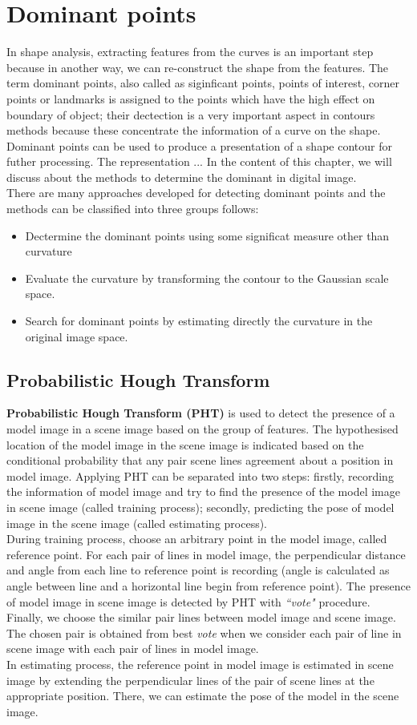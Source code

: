 \chapter{Dominant points}
In shape analysis, extracting features from the curves is an important step because in another way, we can re-construct the shape from the features. The term dominant points, also called as siginficant points, points of interest, corner points or landmarks is assigned to the points which have the high effect on boundary of object; their dectection is a very important aspect in contours methods because these concentrate the information of a curve on the shape.\\[0.2cm]
Dominant points can be used to produce a presentation of a shape contour for futher processing. The representation ...
In the content of this chapter, we will discuss about the methods to determine the dominant in digital image.\\[0.2cm]
There are many approaches developed for detecting dominant points and the methods can be classified into three groups follows:
\begin{itemize}
	\item Dectermine the dominant points using some significat measure other than curvature
	\item Evaluate the curvature by transforming the contour to the Gaussian scale space.
	\item Search for dominant points by estimating directly the curvature in the original image space.
\end{itemize}
\section{Probabilistic Hough Transform}
\textbf{Probabilistic Hough Transform (PHT)} is used to detect the presence of a model image in a scene image based on the group of features. The hypothesised location of the model image in the scene image is indicated based on the conditional probability that any pair scene lines agreement about a position in model image. Applying PHT can be separated into two steps: firstly, recording the information of model image and try to find the presence of the model image in scene image (called training process); secondly, predicting the pose of model image in the scene image (called estimating process).\\[0.2cm]
During training process, choose an arbitrary point in the model image, called reference point. For each pair of lines in model image, the perpendicular distance and angle from each line to reference point is recording (angle is calculated as angle between line and a horizontal line begin from reference point). The presence of model image in scene image is detected by PHT with \textit{``vote"} procedure. Finally, we choose the similar pair lines between model image and scene image. The chosen pair is obtained from best \textit{vote} when we consider each pair of line in scene image with each pair of lines in model image.\\[0.2cm]
In estimating process, the reference point in model image is estimated in scene image by extending the perpendicular lines of the pair of scene lines at the appropriate position. There, we can estimate the pose of the model in the scene image.
